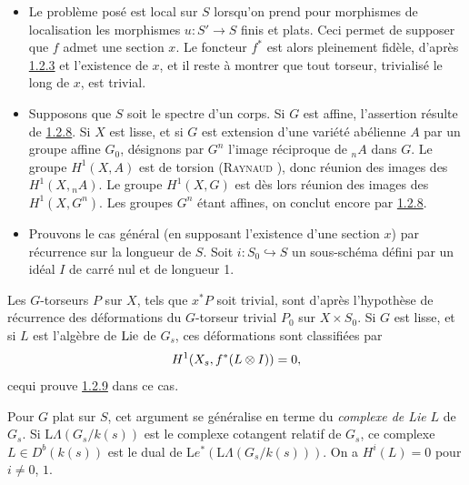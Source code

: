 \documentclass[10pt]{../fichiers-configuration-latex/smfart}
\begin{document}
\begin{itemize}
\item[a.] Le problème posé est local sur $S$ lorsqu'on prend pour
  morphismes de localisation les morphismes $u:S'\rightarrow S$ finis
  et plats. Ceci permet de supposer que $f$ admet une section
$x$. Le
  foncteur $f^{\ast}$ est alors pleinement fidèle, d'après
  \hyperref[XVIII.lem1.2.3]{1.2.3} et
  l'existence de $x$, et il reste à montrer que tout torseur,
  trivialisé le long de $x$, est trivial.

\item[b.] Supposons que $S$ soit le spectre d'un corps. Si $G$ est
  affine, l'assertion résulte de \hyperref[XVIII.lem1.2.8]{1.2.8}. Si $X$ est
  lisse, et si $G$ 
  est extension d'une variété abélienne $A$ par un groupe affine
  $G_{0}$, désignons par $G^{n}$ l'image réciproque de ${}_{n}A$ dans
  $G$. Le groupe $H^{1}(X,A)$ est de torsion (\textsc{Raynaud}
  \cite[XIII 2.6]{SGA4-18:5}),
  donc réunion des images des $H^{1}(X,{}_{n}A)$. Le groupe
  $H^{1}(X,G)$ est dès lors réunion des images des
  $H^{1}(X,G^{n})$. Les groupes $G^{n}$ étant affines, on conclut
  encore par \hyperref[XVIII.lem1.2.8]{1.2.8}.

\item[c.] Prouvons le cas général (en supposant l'existence d'une
  section $x$) par récurrence sur la longueur de $S$. Soit
  $i:S_{0}\hookrightarrow S$ un sous-schéma défini par un idéal $I$ de
  carré nul et de longueur 1.
\end{itemize}

Les $G$-torseurs $P$ sur $X$, tels que $x^{\ast}P$ soit trivial, sont
d'après l'hypothèse de récurrence des déformations du $G$-torseur
trivial $P_{0}$ sur $X\times S_{0}$. Si $G$ est lisse, et si $L$ est
l'algèbre de $\operatorname{Lie}$ de $G_{s}$, ces déformations sont classifiées par 
$$
H^{1}(X_{s},f^{\ast}(L\otimes I))=0{},
$$
ce\pageoriginale qui prouve \hyperref[XVIII.lem1.2.9]{1.2.9} dans ce cas.

Pour $G$ plat sur $S$, cet argument se généralise en terme du
\emph{complexe de Lie} $L$ de $G_{s}$.
Si $\mathrm{L}\Lambda(G_{s}/k(s))$ est le
complexe cotangent relatif de $G_{s}$, ce complexe $L\in
D^{b}(k(s))$ est le dual de
$\mathrm{L}e^{\ast}(\mathrm{L}\Lambda(G_{s}/k(s)))$. On a
$H^{i}(L)=0$ pour
$i\neq 0$, $1$.
\end{document}
